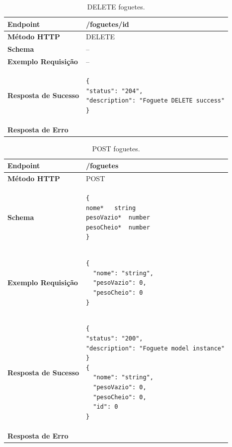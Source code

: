 \begin{apendicesenv}
\begin{table}[H]
\begin{tabular}{|l|l|}
\hline
\textbf{Endpoint}            & /foguetes/{id} \\ \hline
\textbf{Método HTTP}         & DELETE \\ \hline
\textbf{Schema}              &  -- \\ \hline
\textbf{Exemplo Requisição}  &  -- \\ \hline
\textbf{Resposta de Sucesso} &
\begin{lstlisting}
{
"status": "204",
"description": "Foguete DELETE success"
}
\end{lstlisting}
\\ \hline
\textbf{Resposta de Erro}    &  \\ \hline
\end{tabular}
\caption{DELETE foguetes.}
\label{delete_foguetes}
\end{table}


\begin{table}[H]
\begin{tabular}{|l|l|}
\hline
\textbf{Endpoint}            & /foguetes \\ \hline
\textbf{Método HTTP}         & POST \\ \hline
\textbf{Schema}              &  
\begin{lstlisting}
{
nome*	string
pesoVazio*	number
pesoCheio*	number
}
\end{lstlisting}\\ \hline
\textbf{Exemplo Requisição}  &  
\begin{lstlisting}
{
  "nome": "string",
  "pesoVazio": 0,
  "pesoCheio": 0
}
\end{lstlisting}
\\ \hline
\textbf{Resposta de Sucesso} &
\begin{lstlisting}
{
"status": "200",
"description": "Foguete model instance"
}
{
  "nome": "string",
  "pesoVazio": 0,
  "pesoCheio": 0,
  "id": 0
}
\end{lstlisting}
\\ \hline
\textbf{Resposta de Erro}    &  \\ \hline
\end{tabular}
\caption{POST foguetes.}
\label{post_foguetes}
\end{table}


\end{apendicesenv}
